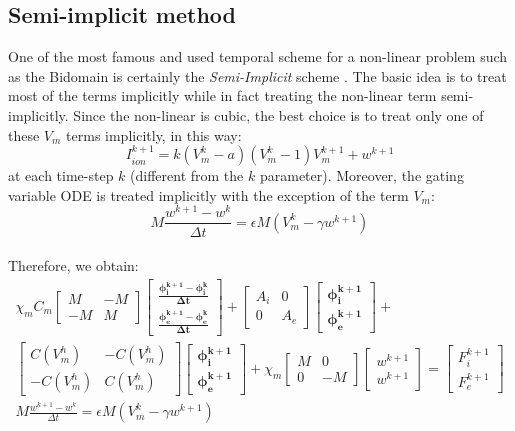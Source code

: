 \documentclass[a4paper,11pt]{article}
\begin{document}
\subsection{Semi-implicit method}
One of the most famous and used temporal scheme for a non-linear problem such as the Bidomain is certainly the \emph{Semi-Implicit} scheme \cite{acta}. The basic idea is to treat most of the terms implicitly while in fact treating the non-linear term semi-implicitly. Since the non-linear is cubic, the best choice is to treat only one of these $V_m$ terms implicitly, in this way:
\begin{equation*}
I_{ion}^{k+1}=k(V_m^k-a)(V_m^k-1)V_m^{k+1}+w^{k+1}
\end{equation*}
at each time-step $k$ (different from the $k$ parameter). 
Moreover, the gating variable ODE is treated implicitly with the exception of the term $V_m$:
\begin{equation*}
M \frac{w^{k+1}-w^k}{\Delta t}=\epsilon M (V_m^k-\gamma w^{k+1})
\end{equation*}
\vspace{5mm} \\
Therefore, we obtain:
\begin{equation}
 \begin{gathered}
 \chi_mC_m \begin{bmatrix}M &-M \\ -M & M \end{bmatrix}
	\begin{bmatrix}\bm{\frac{\phi_i^{k+1}-\phi_i^{k}}{\Delta t}} \\ \bm{\frac{\phi_e^{k+1}-\phi_e^{k}}{\Delta t}}  \end{bmatrix}
	 + \begin{bmatrix}A_i & 0 \\ 0 & A_e \end{bmatrix}
	 \begin{bmatrix}\bm{\phi_i^{k+1}} \\ \bm{\phi_e^{k+1}} \end{bmatrix} +\\
	   \begin{bmatrix}C(V_m^h) & -C(V_m^h) \\ -C(V_m^h) & C(V_m^h) \end{bmatrix} 
	   \begin{bmatrix} \bm{\phi_i^{k+1}} \\ \bm{\phi_e^{k+1}}  \end{bmatrix} 
	   +\chi_m \begin{bmatrix}M & 0 \\ 0 & -M \end{bmatrix} 
	   	\begin{bmatrix}w^{k+1} \\ w^{k+1} \end{bmatrix} = 
	   	\begin{bmatrix} F_i^{k+1} \\ F_e^{k+1}\end{bmatrix}\\
	   M \frac{w^{k+1}-w^k}{\Delta t}=\epsilon M (V_m^k-\gamma w^{k+1})
\end{gathered}
\end{equation}\\
\end{document}
